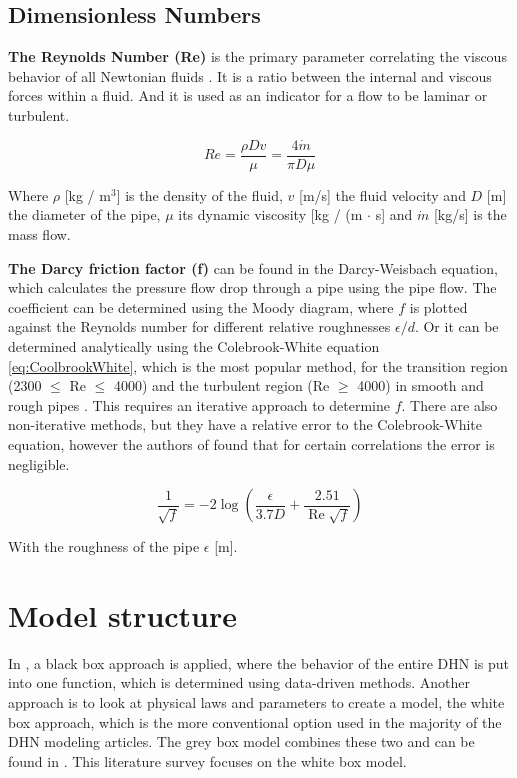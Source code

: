 \subsection{Dimensionless Numbers}
\textbf{The Reynolds Number (Re)} is the primary parameter correlating the viscous behavior of all Newtonian fluids \cite{white2011fluid}. It is a ratio between the internal and viscous forces within a fluid. And it is used as an indicator for a flow to be laminar or turbulent. 

\begin{equation}\label{eq::Re}
R e=\frac{\rho D v}{\mu}=\frac{4 \dot{m}}{\pi D \mu}
\end{equation}

Where $\rho$ [kg / m$^3$] is the density of the fluid, $v$ [m/s] the fluid velocity and $D$ [m] the diameter of the pipe, $\mu$ its dynamic viscosity [kg / (m $\cdot$ s] and $\dot{m}$ [kg/s] is the mass flow. 

\textbf{The Darcy friction factor (f)} can be found in the Darcy-Weisbach equation, which calculates the pressure flow drop through a pipe using the pipe flow. The coefficient can be determined using the Moody diagram, where $f$ is plotted against the Reynolds number for different relative roughnesses $\epsilon / d$. Or it can be determined analytically using the Colebrook-White equation \ref{eq:CoolbrookWhite}, which is the most popular method, for the transition region (2300 $\leq$ Re $\leq$ 4000) and the turbulent region (Re $\geq$ 4000) in smooth and rough pipes \cite{Darcyfrictionfactor}. This requires an iterative approach to determine $f$. There are also non-iterative methods, but they have a relative error to the Colebrook-White equation, however the authors of \cite{Darcyfrictionfactor} found that for certain correlations the error is negligible.

\begin{equation}\label{eq:CoolbrookWhite}
\frac{1}{\sqrt{f}}=-2 \log \left(\frac{\epsilon}{3.7 D}+\frac{2.51}{\operatorname{Re} \sqrt{f}}\right)
\end{equation}

With the roughness of the pipe $\epsilon$ [m].

\section{Model structure}
In \cite{GUELPA2016586}\cite{KECEBAS2012339}, a black box approach is applied, where the behavior of the entire DHN is put into one function, which is determined using data-driven methods. Another approach is to look at physical laws and parameters to create a model, the white box approach, which is the more conventional option used in the majority of the DHN modeling articles. The grey box model combines these two and can be found in \cite{grey1}\cite{grey2}. This literature survey focuses on the white box model.

